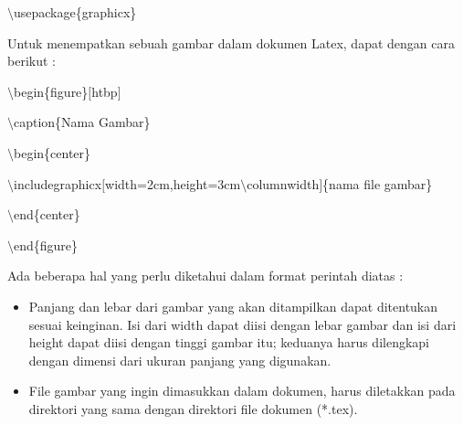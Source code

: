 $\setminus$usepackage\{graphicx\}\par \vspace{12pt}

Untuk menempatkan sebuah gambar dalam dokumen Latex, dapat dengan cara berikut :

$\setminus$begin\{figure\}$[$htbp$]$
\par \vspace{12pt}
$\setminus$caption\{Nama Gambar\}
\par \vspace{12pt}
$\setminus$begin\{center\}
\par \vspace{12pt}

$\setminus$includegraphicx$[$width=2cm,height=3cm$\setminus$columnwidth$]$\{nama file gambar\}
\par \vspace{12pt}
$\setminus$end\{center\}
\par \vspace{12pt}
$\setminus$end\{figure\}
\par \vspace{12pt}


Ada beberapa hal yang perlu diketahui dalam format perintah diatas :

\begin{itemize}
\item Panjang dan lebar dari gambar yang akan ditampilkan dapat ditentukan sesuai keinginan. Isi dari width dapat diisi dengan lebar gambar dan isi dari height dapat diisi dengan tinggi gambar itu; 
keduanya harus dilengkapi dengan dimensi dari ukuran panjang yang digunakan.
\item File gambar yang ingin dimasukkan dalam dokumen, harus diletakkan pada direktori yang sama dengan direktori file dokumen (*.tex).
\end{itemize}

